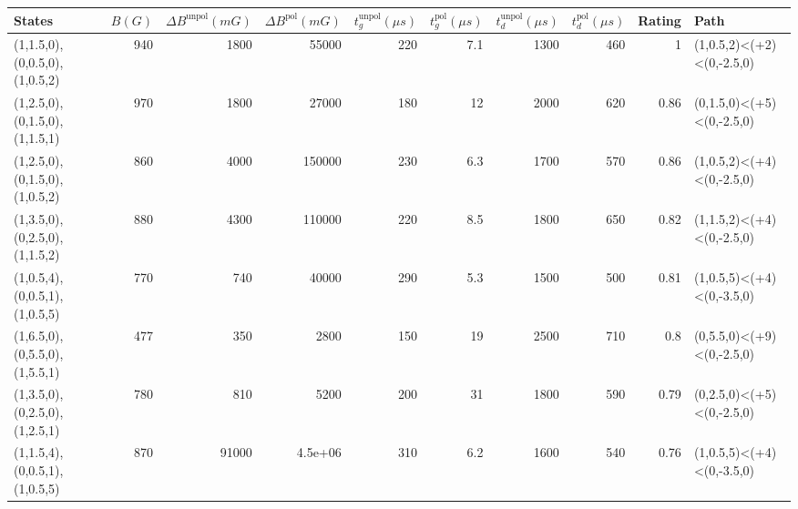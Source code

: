 \begin{tabular}{lrrrrrrrrl}
\hline
 {States}                      &   {$B(G)$} &   {$\Delta B^{\text{unpol}}(mG)$} &   {$\Delta B^{\text{pol}}(mG)$} &   {$t^{\text{unpol}}_{g}(\mu s)$} &   {$t^{\text{pol}}_{g}(\mu s)$} &   {$t^{\text{unpol}}_{d}(\mu s)$} &   {$t^{\text{pol}}_{d}(\mu s)$} &   {Rating} & {Path}                    \\
\hline
 (1,1.5,0),(0,0.5,0),(1,0.5,2) &        940 &                              1800 &                     55000       &                               220 &                             7.1 &                              1300 &                             460 &       1    & (1,0.5,2)<(+2)<(0,-2.5,0) \\
 (1,2.5,0),(0,1.5,0),(1,1.5,1) &        970 &                              1800 &                     27000       &                               180 &                            12   &                              2000 &                             620 &       0.86 & (0,1.5,0)<(+5)<(0,-2.5,0) \\
 (1,2.5,0),(0,1.5,0),(1,0.5,2) &        860 &                              4000 &                    150000       &                               230 &                             6.3 &                              1700 &                             570 &       0.86 & (1,0.5,2)<(+4)<(0,-2.5,0) \\
 (1,3.5,0),(0,2.5,0),(1,1.5,2) &        880 &                              4300 &                    110000       &                               220 &                             8.5 &                              1800 &                             650 &       0.82 & (1,1.5,2)<(+4)<(0,-2.5,0) \\
 (1,0.5,4),(0,0.5,1),(1,0.5,5) &        770 &                               740 &                     40000       &                               290 &                             5.3 &                              1500 &                             500 &       0.81 & (1,0.5,5)<(+4)<(0,-3.5,0) \\
 (1,6.5,0),(0,5.5,0),(1,5.5,1) &        477 &                               350 &                      2800       &                               150 &                            19   &                              2500 &                             710 &       0.8  & (0,5.5,0)<(+9)<(0,-2.5,0) \\
 (1,3.5,0),(0,2.5,0),(1,2.5,1) &        780 &                               810 &                      5200       &                               200 &                            31   &                              1800 &                             590 &       0.79 & (0,2.5,0)<(+5)<(0,-2.5,0) \\
 (1,1.5,4),(0,0.5,1),(1,0.5,5) &        870 &                             91000 &                         4.5e+06 &                               310 &                             6.2 &                              1600 &                             540 &       0.76 & (1,0.5,5)<(+4)<(0,-3.5,0) \\
\hline
\end{tabular}